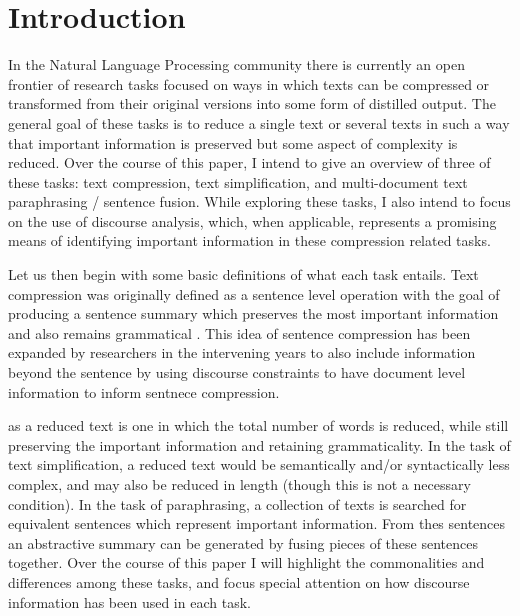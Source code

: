\section{Introduction}

\iffalse
{Talk about what the three different categories are, and how they can be differentiated from each other.  (this should be about 2 paragraphs).  
Then talk about what commonalities each category has with the others(this can be again 1-2 paragraphs) }
\fi


{In the Natural Language Processing community there is currently an open frontier of research tasks focused on ways in which texts can be compressed or transformed from their original versions into some form of distilled output.  The general goal of these tasks is to reduce a single text or several texts in such a way that important information is preserved but some aspect of complexity is reduced.  Over the course of this paper, I intend to give an overview of three of these tasks: text compression, text simplification, and multi-document text paraphrasing / sentence fusion.  While exploring these tasks, I also intend to focus on the use of discourse analysis, which, when applicable, represents a promising means of identifying important information in these compression related tasks.}


{Let us then begin with some basic definitions of what each task entails.  Text compression was originally defined as a sentence level operation with the goal of producing a sentence summary which preserves the most important information and also remains grammatical \citet{Jing2000}.  This idea of sentence compression has been expanded by researchers in the intervening years to also include information beyond the sentence \citet{Clarke&Lapata2010} by using discourse constraints to have document level information to inform sentnece compression.  }


 {as a reduced text is one in which the total number of words is reduced, while still preserving the important information and retaining grammaticality.  In the task of text simplification, a reduced text would be semantically and/or syntactically less complex, and may also be reduced in length (though this is not a necessary condition).  In the task of paraphrasing, a collection of texts is searched for equivalent sentences which represent important information. From thes sentences an abstractive summary can be generated by fusing pieces of these sentences together.
Over the course of this paper I will highlight the commonalities and differences among these tasks, and focus special attention on how discourse information has been used in each task.}



